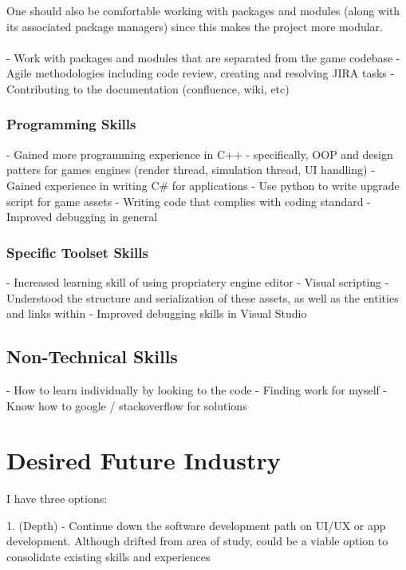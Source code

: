 \documentclass[10pt,letterpaper]{article}
\begin{document}
One should also be comfortable working with packages and modules (along with its associated package managers) since this makes the project more modular.\\
\\

- Work with packages and modules that are separated from the game codebase
- Agile methodologies including code review, creating and resolving JIRA tasks
- Contributing to the documentation (confluence, wiki, etc)

\subsubsection{Programming Skills}
- Gained more programming experience in C++
- specifically, OOP and design patters for games engines (render thread, simulation thread, UI handling)
- Gained experience in writing C\# for applications
- Use python to write upgrade script for game assets
- Writing code that complies with coding standard
- Improved debugging in general

\subsubsection{Specific Toolset Skills}
- Increased learning skill of using propriatery engine editor
- Visual scripting
- Understood the structure and serialization of these assets, as well as the entities and links within
- Improved debugging skills in Visual Studio

\subsection{Non-Technical Skills}
- How to learn individually by looking to the code
- Finding work for myself
- Know how to google / stackoverflow for solutions

\section{Desired Future Industry}\label{desired-future-industry}


I have three options:

1. (Depth)
- Continue down the software development path on UI/UX or app development. Although drifted from area of study, could be a viable option to consolidate existing skills and experiences
\end{document}
